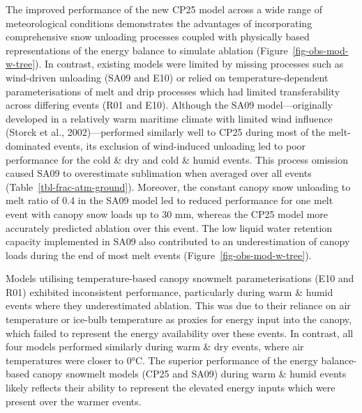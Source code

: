 \documentclass[
  letterpaper,
]{tex/uofsthesis-cs}
\begin{document}
The improved performance of the new CP25 model across a wide range of
meteorological conditions demonstrates the advantages of incorporating
comprehensive snow unloading processes coupled with physically based
representations of the energy balance to simulate ablation
(Figure~\ref{fig-obs-mod-w-tree}). In contrast, existing models were
limited by missing processes such as wind-driven unloading (SA09 and
E10) or relied on temperature-dependent parameterisations of melt and
drip processes which had limited transferability across differing events
(R01 and E10). Although the SA09 model---originally developed in a
relatively warm maritime climate with limited wind influence (Storck et
al., 2002)---performed similarly well to CP25 during most of the
melt-dominated events, its exclusion of wind-induced unloading led to
poor performance for the cold \& dry and cold \& humid events. This
process omission caused SA09 to overestimate sublimation when averaged
over all events (Table~\ref{tbl-frac-atm-ground}). Moreover, the
constant canopy snow unloading to melt ratio of 0.4 in the SA09 model
led to reduced performance for one melt event with canopy snow loads up
to 30 mm, whereas the CP25 model more accurately predicted ablation over
this event. The low liquid water retention capacity implemented in SA09
also contributed to an underestimation of canopy loads during the end of
most melt events (Figure~\ref{fig-obs-mod-w-tree}).

Models utilising temperature-based canopy snowmelt parameterisations
(E10 and R01) exhibited inconsistent performance, particularly during
warm \& humid events where they underestimated ablation. This was due to
their reliance on air temperature or ice-bulb temperature as proxies for
energy input into the canopy, which failed to represent the energy
availability over these events. In contrast, all four models performed
similarly during warm \& dry events, where air temperatures were closer
to 0°C. The superior performance of the energy balance-based canopy
snowmelt models (CP25 and SA09) during warm \& humid events likely
reflects their ability to represent the elevated energy inputs which
were present over the warmer events.
\end{document}
